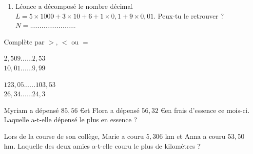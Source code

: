 \begin{pageAD}
\begin{enumerate}
\item Léonce a décomposé le nombre décimal  $L = 5\times 1000 + 3\times 10 + 6 +  1\times 0,1 +  9\times 0,01 $. Peux-tu le retrouver ?
$N = \ldots\ldots\ldots\ldots\ldots\ldots\ldots\ldots $

\end{enumerate}


\vspace{0.4cm}



Complète par $>$, $<$ ou $=$ 
 
\vspace{0.4cm}
\begin{minipage}{0.5\linewidth}

$2,509 \ldots\ldots 2,53$\\
$10,01 \ldots\ldots 9,99$


\end{minipage}
\begin{minipage}{0.5\linewidth}

 $123,05 \ldots\ldots 103,53$\\
 $26,34 \ldots\ldots 24,3$
 

\end{minipage}



Myriam a dépensé $85,56$ \euro et Flora a dépensé $56,32$ \euro en frais d'essence ce mois-ci. Laquelle a-t-elle dépensé le plus en essence ?



Lors de la course de son collège, Marie a couru $5,306$ km et Anna a couru $53,50$ hm. Laquelle des deux amies a-t-elle couru le plus de kilomètres ?





\end{pageAD} 

